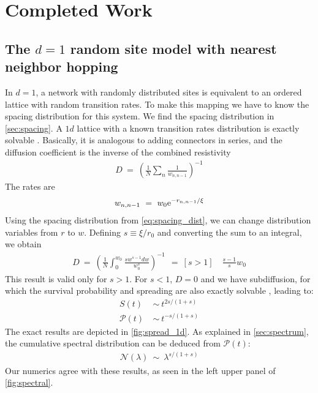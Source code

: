 \chapter{Completed Work}



\section{The $d=1$ random site model with nearest neighbor hopping}

In $d=1$, a network with randomly distributed sites is equivalent to
an ordered lattice with random transition rates. To make this mapping
we have to know the spacing distribution for this system. We find the
spacing distribution in \autoref{sec:spacing}. A $1d$ lattice with
a known transition rates distribution is exactly solvable \cite{alexander_excitation_1981}.
Basically, it is analogous to adding connectors in series, and 
the diffusion coefficient is the inverse of the combined resistivity
%
\begin{align}
D \ =\ \left(\frac{1}{N} \sum_n \frac{1}{w_{n,n-1}}\right)^{-1}
\end{align}
%
The rates are 
%
\begin{align}
w_{n,n-1} \ =\ w_0 \mbox{e}^{-r_{n,n-1}/\xi}
\end{align}
Using the spacing distribution from \autoref{eq:spacing_dist}, we can change distribution variables
from $r$ to $w$. Defining $s \equiv \xi/r_0$ and converting the sum to an integral, we obtain
%
\begin{align}
D \ =\ \left(\frac{1}{N} \int_0^{w_0} \frac{s w^{s-1}dw}{w_0^s}\right)^{-1} \
\ =\ [s>1]\quad \frac{s-1}{s}w_0
\end{align}
This result is valid only for $s>1$. For $s<1$, $D=0$ and we have
subdiffusion, for which the survival probability and spreading 
are also exactly solvable \cite{alexander_excitation_1981}, leading to:
%
\begin{align}
S(t)           \ &\sim \ t^{2s/(1+s)} \\
\mathcal{P}(t) \ &\sim \ t^{-s/(1+s)}
\end{align}
%
The exact results are depicted in \autoref{fig:spread_1d}. 
As explained in \ref{sec:spectrum}, the cumulative spectral distribution
can be deduced from $\mathcal{P}(t)$:
%
\begin{align}
\mathcal{N}(\lambda) \ \sim\ \lambda^{s/(1+s)}
\end{align}
%
Our numerics agree with these results, as seen in the left upper
panel of \autoref{fig:spectral}.

